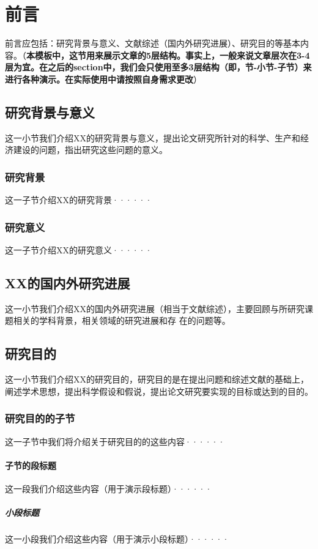 
\section{前言}前言应包括：研究背景与意义、文献综述（国内外研究进展）、研究目的等基本内容。（\textbf{本模板中，这节用来展示文章的5层结构。事实上，一般来说文章层次在3-4层为宜。在之后的section中，我们会只使用至多3层结构（即，节-小节-子节）来进行各种演示。在实际使用中请按照自身需求更改}）
 
\subsection{研究背景与意义}这一小节我们介绍XX的研究背景与意义，提出论文研究所针对的科学、生产和经济建设的问题，指出研究这些问题的意义。
\subsubsection{研究背景} 这一子节介绍XX的研究背景······
\subsubsection{研究意义} 这一子节介绍XX的研究意义······

\subsection{XX的国内外研究进展}这一小节我们介绍XX的国内外研究进展（相当于文献综述），主要回顾与所研究课题相关的学科背景，相关领域的研究进展和存
在的问题等。

\subsection{研究目的} 这一小节我们介绍XX的研究目的，研究目的是在提出问题和综述文献的基础上，阐述学术思想，提出科学假设和假说，提出论文研究要实现的目标或达到的目的。
\subsubsection{研究目的的子节} 这一子节中我们将介绍关于研究目的的这些内容······
\paragraph{子节的段标题}这一段我们介绍这些内容（用于演示段标题）······
\subparagraph{小段标题}这一小段我们介绍这些内容（用于演示小段标题）······

